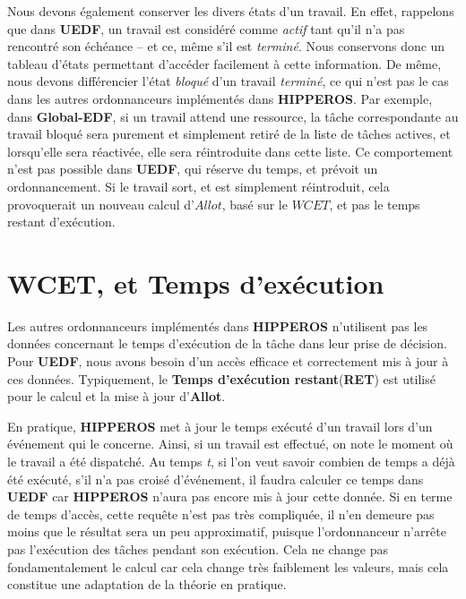 		Nous devons également conserver les divers états d'un travail. En effet, rappelons que dans \textbf{UEDF}, 
		un travail est considéré comme \textit{actif} tant qu'il n'a pas rencontré son échéance -- et ce, 
		même s'il est \textit{terminé}. Nous conservons donc un tableau d'états permettant 
		d'accéder facilement à cette information.
		De même, nous devons différencier l'état \textit{bloqué} d'un travail \textit{terminé}, ce qui n'est pas le cas 
		dans les autres ordonnanceurs implémentés dans \textbf{HIPPEROS}. Par exemple, dans \textbf{Global-EDF}, si un travail 
		attend une ressource, la tâche correspondante au travail bloqué sera purement et simplement retiré de la liste de tâches actives, 
		et lorsqu'elle sera réactivée, elle sera réintroduite dans cette liste. Ce comportement n'est pas possible dans \textbf{UEDF}, 
		qui \og{}réserve\fg{} du temps, et \og{}prévoit\fg{} un ordonnancement. Si le travail sort, et est simplement 
		réintroduit, cela provoquerait un nouveau calcul d'$Allot$, basé sur le $WCET$, et pas le temps restant d'exécution.
		
	\section{WCET, et Temps d'exécution}
		
		Les autres ordonnanceurs implémentés dans \textbf{HIPPEROS} n'utilisent pas les données concernant le temps 
		d'exécution de la tâche dans leur prise de décision. 
		Pour \textbf{UEDF}, nous avons besoin d'un accès efficace et correctement mis à jour à ces données. 
		Typiquement, le \textbf{Temps d'exécution restant}(\textbf{RET}) est utilisé pour le calcul et la mise à jour 
		d'\textbf{Allot}.\newline
		
		En pratique, \textbf{HIPPEROS} met à jour le temps exécuté d'un travail lors d'un événement qui le concerne. 
		Ainsi, si un travail est effectué, on note le moment où le travail a été dispatché.
		Au temps \textit{t}, si l'on veut savoir combien de temps a déjà été exécuté, 
		s'il n'a pas croisé d'événement, il faudra calculer ce temps dans \textbf{UEDF} 
		car \textbf{HIPPEROS} n'aura pas encore mis à jour cette donnée.\newline
		Si en terme de temps d'accès, cette requête n'est pas très compliquée, il n'en demeure pas moins 
		que le résultat sera un peu approximatif, puisque l'ordonnanceur n'arrête pas l'exécution des tâches pendant 
		son exécution. Cela ne change pas fondamentalement le calcul car cela change très faiblement les valeurs, 
		mais cela constitue une adaptation de la théorie en pratique.\newline

